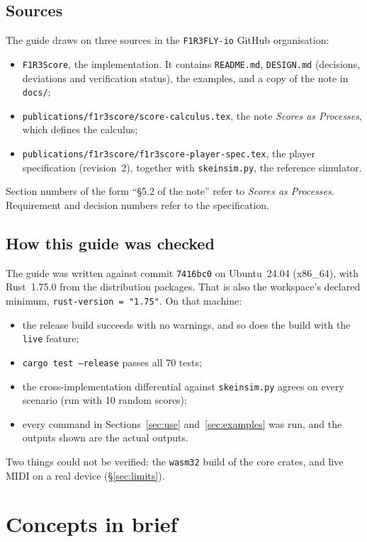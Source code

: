 \documentclass[11pt,a4paper]{article}
\newcommand{\ttx}[1]{\texttt{#1}}
\begin{document}
\subsection{Sources}

The guide draws on three sources in the \ttx{F1R3FLY-io} GitHub organisation:
\begin{itemize}
\item \ttx{F1R3Score}, the implementation. It contains \ttx{README.md},
  \ttx{DESIGN.md} (decisions, deviations and verification status), the
  examples, and a copy of the note in \ttx{docs/};
\item \ttx{publications/f1r3score/score-calculus.tex}, the note \emph{Scores as
  Processes}, which defines the calculus;
\item \ttx{publications/f1r3score/f1r3score-player-spec.tex}, the player
  specification (revision~2), together with \ttx{skeinsim.py}, the reference
  simulator.
\end{itemize}
Section numbers of the form ``\S5.2 of the note'' refer to \emph{Scores as
Processes}. Requirement and decision numbers refer to the specification.

\subsection{How this guide was checked}

The guide was written against commit \ttx{7416bc0} on Ubuntu~24.04 (x86\_64),
with Rust~1.75.0 from the distribution packages. That is also the workspace's
declared minimum, \ttx{rust-version = "1.75"}. On that machine:
\begin{itemize}
\item the release build succeeds with no warnings, and so does the build with
  the \ttx{live} feature;
\item \ttx{cargo test --release} passes all 70 tests;
\item the cross-implementation differential against \ttx{skeinsim.py} agrees
  on every scenario (run with 10 random scores);
\item every command in Sections~\ref{sec:use} and~\ref{sec:examples} was run,
  and the outputs shown are the actual outputs.
\end{itemize}
Two things could not be verified: the \ttx{wasm32} build of the core crates,
and live MIDI on a real device (\S\ref{sec:limits}).

\section{Concepts in brief}\label{sec:concepts}
\end{document}
